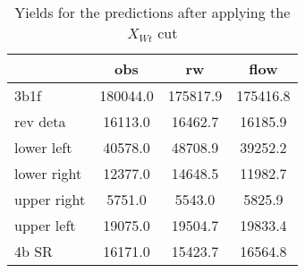 \begin{table}
\centering
\caption{Yields for the predictions after applying the $X_{Wt}$ cut}
\label{tab:ks_Xwt_cut}
\begin{tabular}{lccc}
\toprule
{} &      obs &       rw &     flow \\
\midrule
3b1f        & 180044.0 & 175817.9 & 175416.8 \\
rev deta    &  16113.0 &  16462.7 &  16185.9 \\
lower left  &  40578.0 &  48708.9 &  39252.2 \\
lower right &  12377.0 &  14648.5 &  11982.7 \\
upper right &   5751.0 &   5543.0 &   5825.9 \\
upper left  &  19075.0 &  19504.7 &  19833.4 \\
4b SR       &  16171.0 &  15423.7 &  16564.8 \\
\bottomrule
\end{tabular}
\end{table}
